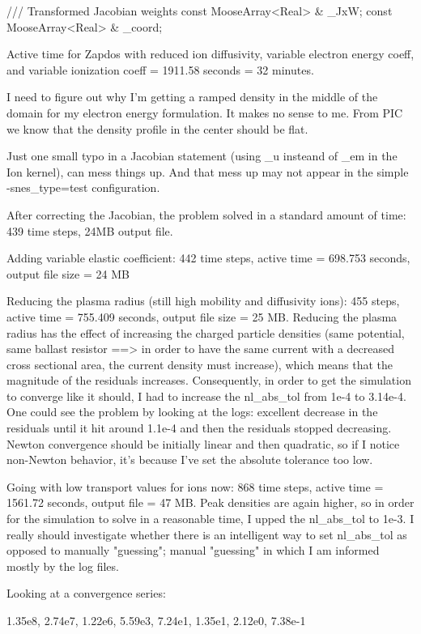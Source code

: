 {  /// Transformed Jacobian weights
  const MooseArray<Real> & _JxW;
  const MooseArray<Real> & _coord;

Active time for Zapdos with reduced ion diffusivity, variable electron energy coeff, and variable ionization coeff = 1911.58 seconds = 32 minutes.

I need to figure out why I'm getting a ramped density in the middle of the domain for my electron energy formulation. It makes no sense to me. From PIC we know that the density profile in the center should be flat.

Just one small typo in a Jacobian statement (using _u insteand of _em in the Ion kernel), can mess things up. And that mess up may not appear in the simple -snes_type=test configuration.

After correcting the Jacobian, the problem solved in a standard amount of time: 439 time steps, 24MB output file.

Adding variable elastic coefficient: 442 time steps, active time = 698.753 seconds, output file size = 24 MB

Reducing the plasma radius (still high mobility and diffusivity ions): 455 steps, active time = 755.409 seconds, output file size = 25 MB. Reducing the plasma radius has the effect of increasing the charged particle densities (same potential, same ballast resistor ==> in order to have the same current with a decreased cross sectional area, the current density must increase), which means that the magnitude of the residuals increases. Consequently, in order to get the simulation to converge like it should, I had to increase the nl_abs_tol from 1e-4 to 3.14e-4. One could see the problem by looking at the logs: excellent decrease in the residuals until it hit around 1.1e-4 and then the residuals stopped decreasing. Newton convergence should be initially linear and then quadratic, so if I notice non-Newton behavior, it's because I've set the absolute tolerance too low.

Going with low transport values for ions now: 868 time steps, active time = 1561.72 seconds, output file = 47 MB. Peak densities are again higher, so in order for the simulation to solve in a reasonable time, I upped the nl_abs_tol to 1e-3. I really should investigate whether there is an intelligent way to set nl_abs_tol as opposed to manually "guessing"; manual "guessing" in which I am informed mostly by the log files.

Looking at a convergence series:

1.35e8, 2.74e7, 1.22e6, 5.59e3, 7.24e1, 1.35e1, 2.12e0, 7.38e-1

}
